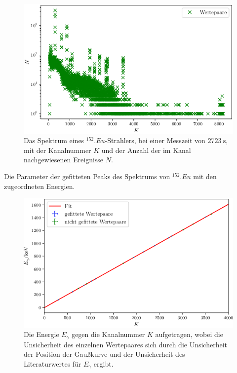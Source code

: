 \begin{figure}
	\centering
	\includegraphics[width=\linewidth-70pt,height=\textheight-70pt,keepaspectratio]{content/images//EU152_1-8192.png}
	\caption{Das Spektrum eines $^{152}.{Eu}$-Strahlers, bei einer Messzeit von $\SI{2723}{\second}$, mit der Kanalnummer $K$ und der Anzahl der im Kanal nachgewiesenen Ereignisse $N$.}
	\label{fig:SpektrumEu}
\end{figure}

\begin{table}
	\centering
	\caption{Die Parameter der gefitteten Peaks des Spektrums von $^{152}.{Eu}$ mit den zugeordneten Energien.}
	
	\label{tab:parameterEu}
\end{table}

\begin{figure}
	\centering
	\includegraphics[width=\linewidth-70pt,height=\textheight-70pt,keepaspectratio]{content/images/EnergieKali.png}
	\caption{Die Energie $E_\gamma$ gegen die Kanalnummer $K$ aufgetragen, wobei die Unsicherheit des einzelnen Wertepaares sich durch die Unsicherheit der Position der Gaußkurve und der Unsicherheit des Literaturwertes für $E_\gamma$ ergibt.}
	\label{fig:Kalibrierung}
\end{figure}

